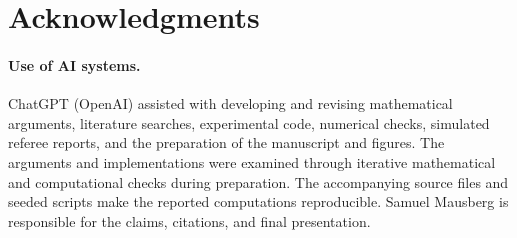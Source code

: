 \section*{Acknowledgments}
\paragraph{Use of AI systems.}
ChatGPT (OpenAI) assisted with developing and revising mathematical arguments, literature searches, experimental code, numerical checks, simulated referee reports, and the preparation of the manuscript and figures. The arguments and implementations were examined through iterative mathematical and computational checks during preparation. The accompanying source files and seeded scripts make the reported computations reproducible. Samuel Mausberg is responsible for the claims, citations, and final presentation.

